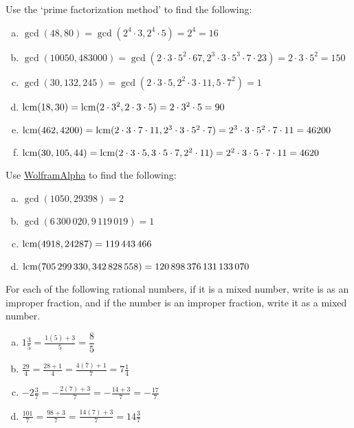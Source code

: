 \documentclass[11pt,letterpaper]{article}
\begin{document}
 Use the `prime factorization method' to find the following: \pspace
\begin{enumerate}[(a)]
\item $\gcd(48, 80)= \gcd(2^4 \cdot 3, 2^4 \cdot 5)= 2^4= 16$ \vfill
\item $\gcd(10050, 483000)= \gcd(2 \cdot 3 \cdot 5^2 \cdot 67, 2^3 \cdot 3 \cdot 5^3 \cdot 7 \cdot 23)= 2 \cdot 3 \cdot 5^2= 150$ \vfill
\item $\gcd(30, 132, 245)= \gcd(2 \cdot 3 \cdot 5, 2^2 \cdot 3 \cdot 11, 5 \cdot 7^2)= 1$ \vfill
\item $\operatorname{lcm}(18,30)= \operatorname{lcm}(2 \cdot 3^2, 2 \cdot 3 \cdot 5)= 2 \cdot 3^2 \cdot 5= 90$ \vfill
\item $\operatorname{lcm}(462,4200)= \operatorname{lcm}(2 \cdot 3 \cdot 7 \cdot 11, 2^3 \cdot 3 \cdot 5^2 \cdot 7)= 2^3 \cdot 3 \cdot 5^2 \cdot 7 \cdot 11= 46200$ \vfill
\item $\operatorname{lcm}(30, 105, 44)= \operatorname{lcm}(2 \cdot 3 \cdot 5, 3 \cdot 5 \cdot 7, 2^2 \cdot 11)= 2^2 \cdot 3 \cdot 5 \cdot 7 \cdot 11= 4620$ \vfill
\end{enumerate}





\newpage





 Use \href{https://www.wolframalpha.com/}{WolframAlpha} to find the following: \pspace
\begin{enumerate}[(a)] 
\item $\gcd(1050, 29398)= 2$ \vspace{0.5cm}
\item $\gcd(6\,300\,020, 9\,119\,019)= 1$ \vspace{0.5cm}
\item $\operatorname{lcm}(4918, 24287)= 119\, 443\, 466$ \vspace{0.5cm}
\item $\operatorname{lcm}(705\,299\,330, 342\,828\,558)= 120\, 898\, 376\, 131\, 133\, 070$ \vspace{0.5cm}
\end{enumerate}



\vfill



 For each of the following rational numbers, if it is a mixed number, write is as an improper fraction, and if the number is an improper fraction, write it as a mixed number. \pspace
\begin{enumerate}[(a)] \itemsep=2ex
\item $1\frac{3}{5}= \frac{1(5) + 3}{5}= \dfrac{8}{5}$
\item $\frac{29}{4}= \frac{28 + 1}{4}= \frac{4(7) + 1}{7}= 7\frac{1}{4}$
\item $-2\frac{3}{7}= -\frac{2(7) + 3}{7}= -\frac{14 + 3}{7}= -\frac{17}{7}$
\item $\frac{101}{7}= \frac{98 + 3}{7}= \frac{14(7) + 3}{7}= 14\frac{3}{7}$
\end{enumerate} \pspace
\end{document}
